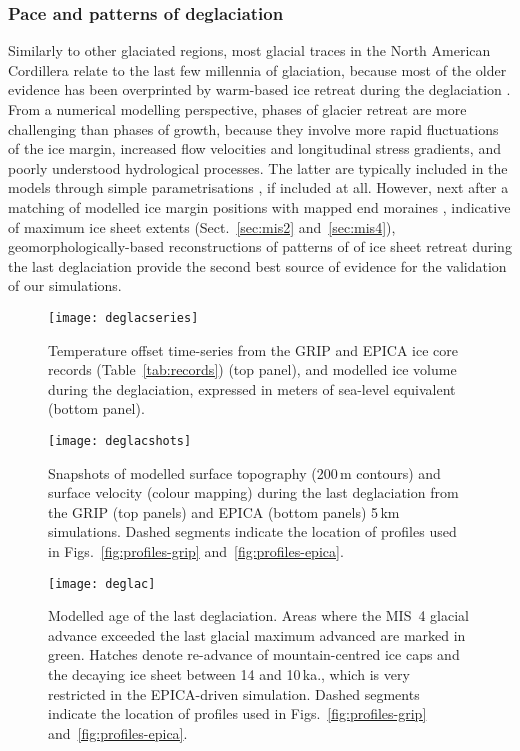 \documentclass[tc]{copernicus}
\begin{document}
\subsubsection{Pace and patterns of deglaciation}

Similarly to other glaciated regions, most glacial traces in the North American
Cordillera relate to the last few millennia of glaciation, because most of the
older evidence has been overprinted by warm-based ice retreat
during the deglaciation \citep{Kleman.1994, Kleman.etal.2010}. From a
numerical modelling perspective, phases of glacier retreat are more challenging
than phases of growth, because they involve more rapid fluctuations of the ice
margin, increased flow velocities and longitudinal stress gradients, and poorly
understood hydrological processes. The latter are typically included in the
models through simple parametrisations \citep[e.g.][]{Clason.etal.2012,
Clason.etal.2014, Bueler.Pelt.2014}, if included at all. However, next after a
matching of modelled ice margin positions with mapped end moraines
\citep{Napieralski.etal.2007}, indicative of maximum ice sheet extents
(Sect.~\ref{sec:mis2} and~\ref{sec:mis4}), geomorphologically-based
reconstructions of patterns of of ice sheet retreat during the last
deglaciation provide the second best source of evidence for the validation of
our simulations.

\begin{figure}
  \texttt{[image: deglacseries]}
  \caption{Temperature offset time-series from the GRIP and EPICA ice core
           records (Table~\ref{tab:records}) (top panel), and modelled ice
           volume during the deglaciation, expressed in meters of sea-level
           equivalent (bottom panel).}
  \label{fig:deglacseries}
\end{figure}

\begin{figure*}
  \texttt{[image: deglacshots]}
  \caption{Snapshots of modelled surface topography (200\,m contours)
           and surface velocity (colour mapping) during the last deglaciation
           from the GRIP (top panels) and EPICA (bottom panels) 5\,km simulations.
           Dashed segments indicate the location of profiles used in
           Figs.~\ref{fig:profiles-grip} and~\ref{fig:profiles-epica}.}
  \label{fig:deglacshots}
\end{figure*}

\begin{figure*}
  \vspace{-1.5mm}  %
  \texttt{[image: deglac]}
  \caption{Modelled age of the last deglaciation. Areas where the MIS~4 glacial
           advance exceeded the last glacial maximum advanced are marked in
           green. Hatches denote re-advance of mountain-centred ice caps and
           the decaying ice sheet between 14 and 10\,ka., which is very
           restricted in the EPICA-driven simulation.
           Dashed segments indicate the location of profiles used in
           Figs.~\ref{fig:profiles-grip} and~\ref{fig:profiles-epica}.}
  \label{fig:deglac}
\end{figure*}
\end{document}
